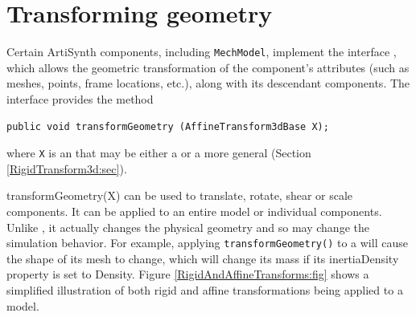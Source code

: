 \section{Transforming geometry}
\label{TransformingGeometry:sec}

Certain ArtiSynth components, including {\tt MechModel}, implement the
interface ,
which allows the geometric transformation of the component's
attributes (such as meshes, points, frame locations, etc.), along with
its descendant components. The interface provides the method
%
\begin{lstlisting}[]
   public void transformGeometry (AffineTransform3dBase X);
\end{lstlisting}
%
where {\tt X} is an 
that may be either a  or a
more general  (Section
\ref{RigidTransform3d:sec}).

%
{transformGeometry(X)}
can be used to translate, rotate, shear or scale components. It
can be applied to an entire model or individual components. Unlike
, it
actually changes the physical geometry and so may change the
simulation behavior. For example, applying {\tt transformGeometry()}
to a  will cause the
shape of its mesh to change, which will change its mass if its {\sf
inertiaDensity} property is set to {\sf Density}.
Figure \ref{RigidAndAffineTransforms:fig} shows a simplified
illustration of both rigid and affine transformations being applied to
a model.

